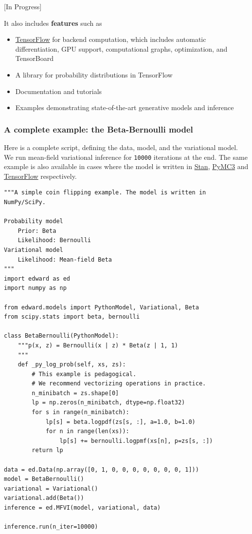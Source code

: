 {[}In Progress{]}




It also includes \textbf{features} such as
\begin{itemize}
\item \href{https://www.tensorflow.org}{TensorFlow} for backend computation,
  which includes automatic differentiation, GPU support, computational
  graphs, optimization, and TensorBoard
\item A library for probability distributions in TensorFlow
\item Documentation and tutorials
\item Examples demonstrating state-of-the-art generative models and
  inference
\end{itemize}


\subsubsection{A complete example: the Beta-Bernoulli
model}\label{a-complete-example-the-beta-bernoulli-model}

Here is a complete script, defining the data, model, and the variational
model. We run mean-field variational inference for \texttt{10000}
iterations at the end. The same example is also available in cases where
the model is written in
\href{https://github.com/blei-lab/edward/blob/master/examples/beta_bernoulli_stan.py}{Stan},
\href{https://github.com/blei-lab/edward/blob/master/examples/beta_bernoulli_pymc3.py}{PyMC3}
and
\href{https://github.com/blei-lab/edward/blob/master/examples/beta_bernoulli_tf.py}{TensorFlow}
respectively.

\begin{verbatim}
"""A simple coin flipping example. The model is written in NumPy/SciPy.

Probability model
    Prior: Beta
    Likelihood: Bernoulli
Variational model
    Likelihood: Mean-field Beta
"""
import edward as ed
import numpy as np

from edward.models import PythonModel, Variational, Beta
from scipy.stats import beta, bernoulli

class BetaBernoulli(PythonModel):
    """p(x, z) = Bernoulli(x | z) * Beta(z | 1, 1)
    """
    def _py_log_prob(self, xs, zs):
        # This example is pedagogical.
        # We recommend vectorizing operations in practice.
        n_minibatch = zs.shape[0]
        lp = np.zeros(n_minibatch, dtype=np.float32)
        for s in range(n_minibatch):
            lp[s] = beta.logpdf(zs[s, :], a=1.0, b=1.0)
            for n in range(len(xs)):
                lp[s] += bernoulli.logpmf(xs[n], p=zs[s, :])
        return lp

data = ed.Data(np.array([0, 1, 0, 0, 0, 0, 0, 0, 0, 1]))
model = BetaBernoulli()
variational = Variational()
variational.add(Beta())
inference = ed.MFVI(model, variational, data)

inference.run(n_iter=10000)
\end{verbatim}

